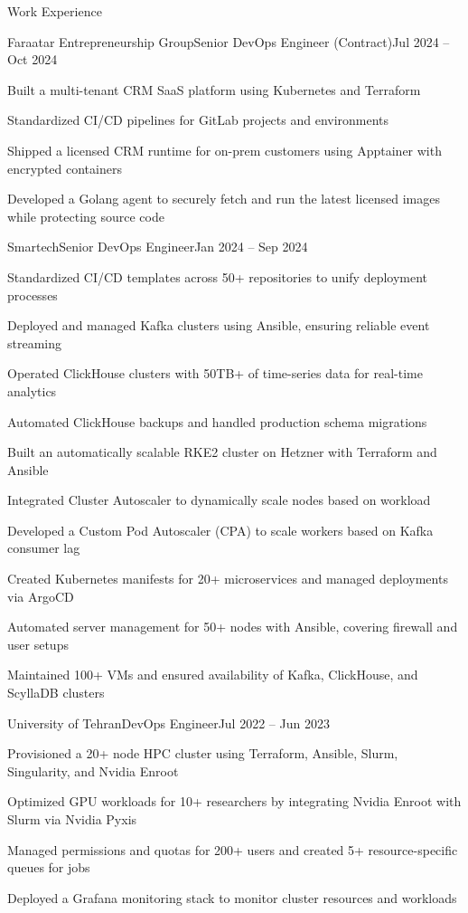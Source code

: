 \documentclass[]{main}
\begin{document}
\begin{section}{Work Experience}
 \begin{subsection}{Faraatar Entrepreneurship Group}{Senior DevOps Engineer (Contract)}{Jul 2024 -- Oct 2024}{}
     \item Built a multi-tenant CRM SaaS platform using Kubernetes and Terraform
     \item Standardized CI/CD pipelines for GitLab projects and environments
     \item Shipped a licensed CRM runtime for on-prem customers using Apptainer with encrypted containers
     \item Developed a Golang agent to securely fetch and run the latest licensed images while protecting source code
 \end{subsection}

 \begin{subsection}{Smartech}{Senior DevOps Engineer}{Jan 2024 -- Sep 2024}{}
     \item Standardized CI/CD templates across 50+ repositories to unify deployment processes
     \item Deployed and managed Kafka clusters using Ansible, ensuring reliable event streaming
     \item Operated ClickHouse clusters with 50TB+ of time-series data for real-time analytics
     \item Automated ClickHouse backups and handled production schema migrations
     \item Built an automatically scalable RKE2 cluster on Hetzner with Terraform and Ansible
     \item Integrated Cluster Autoscaler to dynamically scale nodes based on workload
     \item Developed a Custom Pod Autoscaler (CPA) to scale workers based on Kafka consumer lag
     \item Created Kubernetes manifests for 20+ microservices and managed deployments via ArgoCD
     \item Automated server management for 50+ nodes with Ansible, covering firewall and user setups
     \item Maintained 100+ VMs and ensured availability of Kafka, ClickHouse, and ScyllaDB clusters
 \end{subsection}

 \begin{subsection}{University of Tehran}{DevOps Engineer}{Jul 2022 -- Jun 2023}{}
     \item Provisioned a 20+ node HPC cluster using Terraform, Ansible, Slurm, Singularity, and Nvidia Enroot
     \item Optimized GPU workloads for 10+ researchers by integrating Nvidia Enroot with Slurm via Nvidia Pyxis
     \item Managed permissions and quotas for 200+ users and created 5+ resource-specific queues for jobs
     \item Deployed a Grafana monitoring stack to monitor cluster resources and workloads
 \end{subsection}


\end{section}
\end{document}
